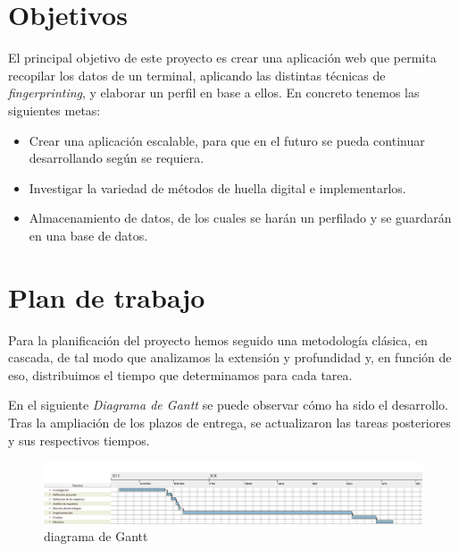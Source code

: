 \section{Objetivos}
 
El principal objetivo de este proyecto es crear una aplicación web que permita recopilar los datos de un terminal, aplicando las distintas técnicas de \textit{fingerprinting}, y elaborar un perfil en base a ellos. En concreto tenemos las siguientes metas:
\begin{itemize}
    \item Crear una aplicación escalable, para que en el futuro se pueda continuar desarrollando según se requiera.
    \item Investigar la variedad de métodos de huella digital e implementarlos.
    \item Almacenamiento de datos, de los cuales se harán un perfilado y se guardarán en una base de datos.
\end{itemize}

\section{Plan de trabajo}
Para la planificación del proyecto hemos seguido una metodología clásica, en cascada, de tal modo que analizamos la extensión y profundidad y, en función de eso, distribuimos el tiempo que determinamos para cada tarea.\par
En el siguiente \textit{Diagrama de Gantt} se puede observar cómo ha sido el desarrollo. Tras la ampliación de los plazos de entrega, se actualizaron las tareas posteriores y sus respectivos tiempos.\par
\begin{figure}[H]
    \centering
    \includegraphics[width=1\textwidth]{Images/diagramaGantt.png}
    \caption{diagrama de Gantt}
    \label{fig:diagramaGantt}
\end{figure}